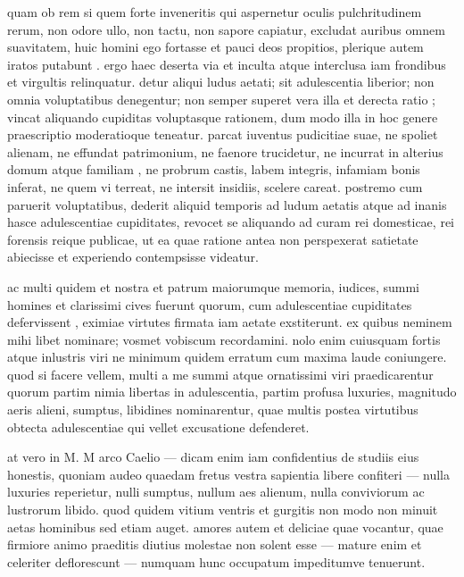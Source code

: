 quam ob rem si quem forte inveneritis qui aspernetur oculis pulchritudinem rerum, non odore ullo, non tactu, non sapore capiatur, excludat auribus omnem suavitatem, huic homini ego fortasse et pauci deos propitios, plerique autem iratos putabunt . ergo haec deserta via et inculta atque interclusa iam frondibus et virgultis relinquatur. detur aliqui ludus aetati; sit adulescentia liberior; non omnia voluptatibus denegentur; non semper superet vera illa et derecta ratio ; vincat aliquando cupiditas voluptasque rationem, dum modo illa in hoc genere praescriptio moderatioque teneatur. parcat iuventus pudicitiae suae, ne spoliet alienam, ne effundat patrimonium, ne faenore trucidetur, ne incurrat in alterius domum atque familiam , ne probrum castis, labem integris, infamiam bonis inferat, ne quem vi terreat, ne intersit insidiis, scelere careat. postremo cum paruerit voluptatibus, dederit aliquid temporis ad ludum aetatis atque ad inanis hasce adulescentiae cupiditates, revocet se aliquando ad curam rei domesticae, rei forensis reique publicae, ut ea quae ratione antea non perspexerat satietate abiecisse et experiendo contempsisse videatur.

 ac multi quidem et nostra et patrum maiorumque memoria, iudices, summi homines et clarissimi cives fuerunt quorum, cum adulescentiae cupiditates defervissent , eximiae virtutes firmata iam aetate exstiterunt. ex quibus neminem mihi libet nominare; vosmet vobiscum recordamini. nolo enim cuiusquam fortis atque inlustris viri ne minimum quidem erratum cum maxima laude coniungere. quod si facere vellem, multi a me summi atque ornatissimi viri praedicarentur quorum partim nimia libertas in adulescentia, partim profusa luxuries, magnitudo aeris alieni, sumptus, libidines nominarentur, quae multis postea virtutibus obtecta adulescentiae qui vellet excusatione defenderet.

 at vero in M. M arco Caelio — dicam enim iam confidentius de studiis eius honestis, quoniam audeo quaedam fretus vestra sapientia libere confiteri — nulla luxuries reperietur, nulli sumptus, nullum aes alienum, nulla conviviorum ac lustrorum libido. quod quidem vitium ventris et gurgitis non modo non minuit aetas hominibus sed etiam auget. amores autem et deliciae quae vocantur, quae firmiore animo praeditis diutius molestae non solent esse — mature enim et celeriter deflorescunt — numquam hunc occupatum impeditumve tenuerunt.

